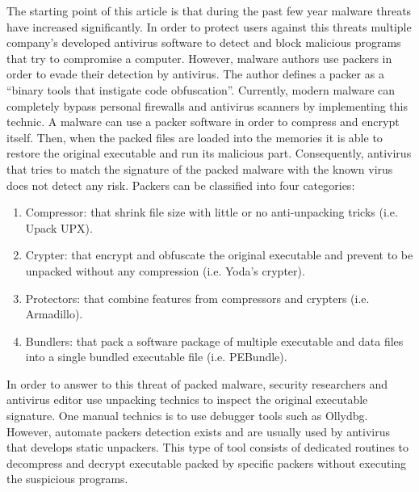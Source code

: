The starting point of this article is that during the past few year malware threats have
increased significantly. In order to protect users against this threats multiple company’s
developed antivirus software to detect and block malicious programs that try to compromise
a computer. However, malware authors use packers in order to evade their detection by
antivirus. The author defines a packer as a “binary tools that instigate code obfuscation”.
Currently, modern malware can completely bypass personal firewalls and antivirus scanners by
implementing this technic. A malware can use a packer software in order to compress and encrypt
itself. Then, when the packed files are loaded into the memories it is able to restore the
original executable and run its malicious part. Consequently, antivirus that tries to match
the signature of the packed malware with the known virus does not detect any risk.
Packers can be classified into four categories:

\begin{enumerate}
  \item Compressor: that shrink file size with little or no anti-unpacking tricks (i.e. Upack UPX).
  \item Crypter: that encrypt and obfuscate the original executable and prevent to be unpacked without any compression (i.e. Yoda’s crypter).
  \item Protectors: that combine features from compressors and crypters (i.e. Armadillo).
  \item Bundlers: that pack a software package of multiple executable and data files into a single bundled executable file (i.e. PEBundle).
\end{enumerate}

In order to answer to this threat of packed malware, security researchers and antivirus
editor use unpacking technics to inspect the original executable signature. One manual
technics is to use debugger tools such as Ollydbg. However, automate packers detection
exists and are usually used by antivirus that develops static unpackers. This type of tool
consists of dedicated routines to decompress and decrypt executable packed by specific
packers without executing the suspicious programs.